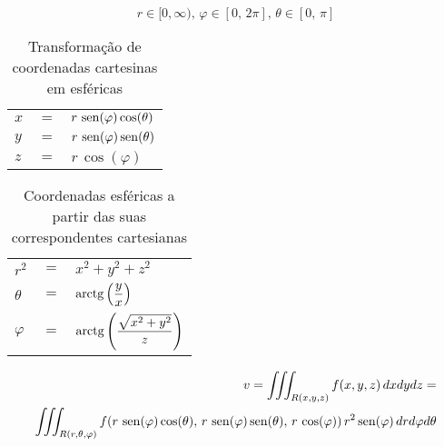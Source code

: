 	$$r \in [0, \infty),\, \varphi \in [0,\, 2\pi],\, \theta \in [0,\, \pi]$$
	
	\begin{table}[H]
		\caption{Transformação de coordenadas cartesinas em esféricas}
		\label{transformacao_coordenadas_cartesianas_esfericas}
		\centering		
		\begin{tabular}{|lcl|}
			$x$ & $=$ & $r\,\operatorname{sen}(\varphi)\cos(\theta)$ \\
			$y$ & $=$ & $r\,\operatorname{sen}(\varphi)\operatorname{sen}(\theta)$ \\
			$z$ & $=$ & $r\,\cos(\varphi)$
		\end{tabular}		
	\end{table}	
	\begin{table}[H]
		\caption{Coordenadas esféricas a partir das suas correspondentes cartesianas}
		\label{correpondentes_coordenadas_cartesianas_esfericas}
		\centering		
		\begin{tabular}{|lcl|}
			$r^2$     & $=$ & $x^2 + y^2 + z^2$                                \\
			$\theta$  & $=$ & $\operatorname{arctg}\left(\dfrac{y}{x}\right)$                \\
			$\varphi$ & $=$ & $\operatorname{arctg}\left(\dfrac{\sqrt{x^2 + y^2}}{z}\right)$
		\end{tabular}		
	\end{table}
	
	\begin{align*}
		v = \iiint_{R(x,y,z)} f(x,y,z)\, dxdydz =\\ \iiint_{R(r,\theta,\varphi)} f(r\,\operatorname{sen}(\varphi)\cos(\theta),\, r\,\operatorname{sen}(\varphi)\operatorname{sen}(\theta),\, r\,\cos(\varphi))\, r^2\operatorname{sen}(\varphi)\, dr d\varphi d\theta
	\end{align*}